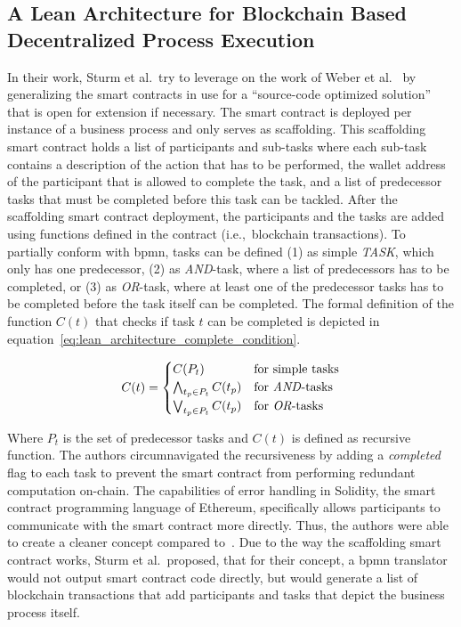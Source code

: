 \subsection{A Lean Architecture for Blockchain Based Decentralized Process Execution~\cite{lean_architecture_for_blockchain_based_process_execution}}

In their work, Sturm et al.\ try to leverage on the work of Weber et al.~\cite{untrusted_bp_execution_using_blockchain} by generalizing the smart contracts in use for a ``source-code optimized solution'' that is open for extension if necessary. The smart contract is deployed per instance of a business process and only serves as scaffolding. This scaffolding smart contract holds a list of participants and sub-tasks where each sub-task contains a description of the action that has to be performed, the wallet address of the participant that is allowed to complete the task, and a list of predecessor tasks that must be completed before this task can be tackled. After the scaffolding smart contract deployment, the participants and the tasks are added using functions defined in the contract (i.e.,\ blockchain transactions). To partially conform with \gls{bpmn}, tasks can be defined (1) as simple \textit{TASK}, which only has one predecessor, (2) as \textit{AND}-task, where a list of predecessors has to be completed, or (3) as \textit{OR}-task, where at least one of the predecessor tasks has to be completed before the task itself can be completed. The formal definition of the function $C(t)$ that checks if task $t$ can be completed is depicted in equation~\ref{eq:lean_architecture_complete_condition}.

\begin{equation}
    C(t)=\begin{cases}
        C(P_t) & \text{for simple tasks} \\
        \bigwedge_{t_p \in P_t} C(t_p) & \text{for \textit{AND}-tasks} \\
        \bigvee_{t_p \in P_t} C(t_p) & \text{for \textit{OR}-tasks}
    \end{cases}
    \label{eq:lean_architecture_complete_condition}
\end{equation}

Where $P_t$ is the set of predecessor tasks and $C(t)$ is defined as recursive function. The authors circumnavigated the recursiveness by adding a \textit{completed} flag to each task to prevent the smart contract from performing redundant computation on-chain. The capabilities of error handling in Solidity, the smart contract programming language of Ethereum, specifically allows participants to communicate with the smart contract more directly. Thus, the authors were able to create a cleaner concept compared to~\cite{untrusted_bp_execution_using_blockchain}. Due to the way the scaffolding smart contract works, Sturm et al.\ proposed, that for their concept, a \gls{bpmn} translator would not output smart contract code directly, but would generate a list of blockchain transactions that add participants and tasks that depict the business process itself.


